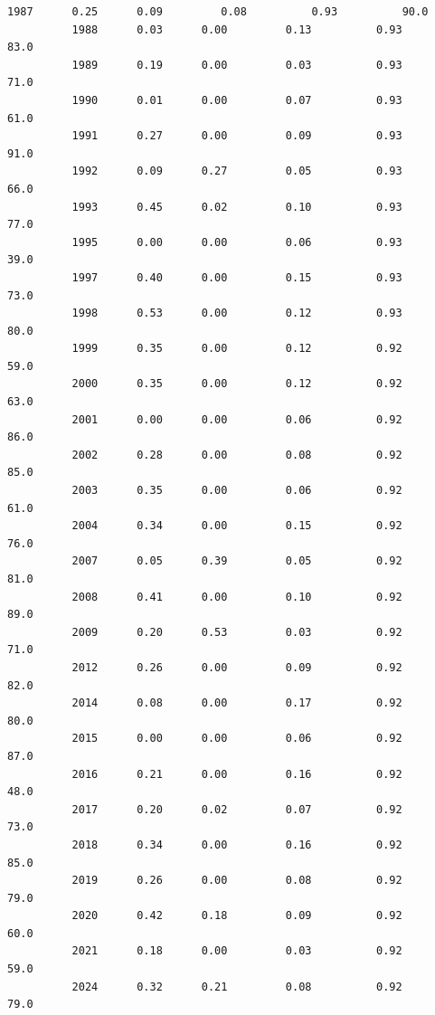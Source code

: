 \documentclass[11pt]{article}
\begin{document}
\begin{Verbatim}[commandchars=\\\{\}]
          1987      0.25      0.09         0.08          0.93          90.0   
          1988      0.03      0.00         0.13          0.93          83.0   
          1989      0.19      0.00         0.03          0.93          71.0   
          1990      0.01      0.00         0.07          0.93          61.0   
          1991      0.27      0.00         0.09          0.93          91.0   
          1992      0.09      0.27         0.05          0.93          66.0   
          1993      0.45      0.02         0.10          0.93          77.0   
          1995      0.00      0.00         0.06          0.93          39.0   
          1997      0.40      0.00         0.15          0.93          73.0   
          1998      0.53      0.00         0.12          0.93          80.0   
          1999      0.35      0.00         0.12          0.92          59.0   
          2000      0.35      0.00         0.12          0.92          63.0   
          2001      0.00      0.00         0.06          0.92          86.0   
          2002      0.28      0.00         0.08          0.92          85.0   
          2003      0.35      0.00         0.06          0.92          61.0   
          2004      0.34      0.00         0.15          0.92          76.0   
          2007      0.05      0.39         0.05          0.92          81.0   
          2008      0.41      0.00         0.10          0.92          89.0   
          2009      0.20      0.53         0.03          0.92          71.0   
          2012      0.26      0.00         0.09          0.92          82.0   
          2014      0.08      0.00         0.17          0.92          80.0   
          2015      0.00      0.00         0.06          0.92          87.0   
          2016      0.21      0.00         0.16          0.92          48.0   
          2017      0.20      0.02         0.07          0.92          73.0   
          2018      0.34      0.00         0.16          0.92          85.0   
          2019      0.26      0.00         0.08          0.92          79.0   
          2020      0.42      0.18         0.09          0.92          60.0   
          2021      0.18      0.00         0.03          0.92          59.0   
          2024      0.32      0.21         0.08          0.92          79.0   
          

\end{Verbatim}
\end{document}
